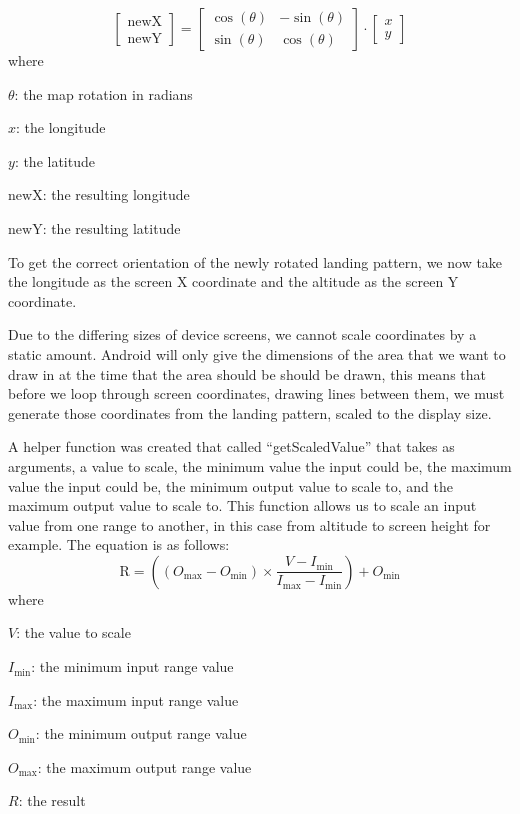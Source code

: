 \begin{equation}\label{eq:matrix-mult}
  \begin{bmatrix}
    \mathrm{newX} \\[0.3em]
    \mathrm{newY}
  \end{bmatrix}
  =
  \begin{bmatrix}
    \cos(\theta)  & -\sin(\theta) \\[0.3em]
    \sin(\theta) & \cos(\theta)
  \end{bmatrix}\cdot
  \begin{bmatrix}
    x \\[0.3em]
    y
  \end{bmatrix}
\end{equation}
where
\begin{description}
  \item $\theta$: the map rotation in radians
  \item $x$: the longitude
  \item $y$: the latitude
  \item $\mathrm{newX}$: the resulting longitude
  \item $\mathrm{newY}$: the resulting latitude
\end{description}

To get the correct orientation of the newly rotated landing pattern, we now take the longitude as the screen X coordinate and the altitude as the screen Y coordinate.

Due to the differing sizes of device screens, we cannot scale coordinates by a static amount. Android will only give the dimensions of the area that we want to draw in at the time that the area should be should be drawn, this means that before we loop through screen coordinates, drawing lines between them, we must generate those coordinates from the landing pattern, scaled to the display size.

A helper function was created that called ``getScaledValue'' that takes as arguments, a value to scale, the minimum value the input could be, the maximum value the input could be, the minimum output value to scale to, and the maximum output value to scale to. This function allows us to scale an input value from one range to another, in this case from altitude to screen height for example. The equation is as follows:
\begin{equation}\label{eq:scale-values}
  \mathrm{R} = \left((O_{\mathrm{max}} - O_{\mathrm{min}}) \times \frac{V - I_{\mathrm{min}}}{I_{\mathrm{max}} - I_{\mathrm{min}}}\right) + O_{\mathrm{min}}
\end{equation}
where
\begin{description}
  \item $V$: the value to scale
  \item $I_{\mathrm{min}}$: the minimum input range value
  \item $I_{\mathrm{max}}$: the maximum input range value
  \item $O_{\mathrm{min}}$: the minimum output range value
  \item $O_{\mathrm{max}}$: the maximum output range value
  \item $R$: the result
\end{description}

